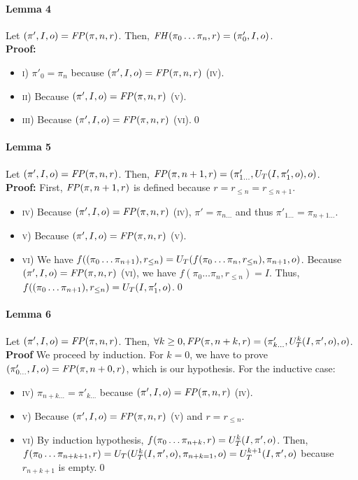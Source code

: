 \paragraph{Lemma 4}
Let $(\pi',I,o)=\mathit{FP}(\pi,n,r)$. Then, $\mathit{FH}(\pi_0\dots\pi_n,r)=(\pi'_0,I,o)$.\\
\textbf{Proof:} \begin{itemize}
\item\textsc{i)} $\pi'_0=\pi_n$ because $(\pi',I,o)=\mathit{FP}(\pi,n,r)$ (\textsc{iv}).
\item\textsc{ii)} Because $(\pi',I,o)=\mathit{FP}(\pi,n,r)$ (\textsc{v}).
\item\textsc{iii)} Because $(\pi',I,o)=\mathit{FP}(\pi,n,r)$ (\textsc{vi}).\qed
\end{itemize}

\paragraph{Lemma 5}
Let $(\pi',I,o)=\mathit{FP}(\pi,n,r)$. Then, $\mathit{FP}(\pi,n+1,r)=(\pi'_{1\dots},U_T(I,\pi'_1,o),o)$.\\
\textbf{Proof:}
First, $\mathit{FP}(\pi,n+1,r)$ is defined because $r=r_{\leq n}=r_{\leq n+1}$.
\begin{itemize}
\item\textsc{iv)} Because $(\pi',I,o)=\mathit{FP}(\pi,n,r)$ (\textsc{iv}), $\pi'=\pi_{n\dots}$ and thus $\pi'_{1\dots}=\pi_{n+1\dots}$.
\item\textsc{v)} Because $(\pi',I,o)=\mathit{FP}(\pi,n,r)$ (\textsc{v}).
\item\textsc{vi)} We have $f((\pi_0\dots\pi_{n+1}),r_{\leq n})=U_T(f(\pi_0\dots\pi_n,r_{\leq n}),\pi_{n+1},o)$. Because $(\pi',I,o)=\mathit{FP}(\pi,n,r)$ (\textsc{vi}), we have $f(\pi_0\dots\pi_n,r_{\leq n})=I$. Thus, $f((\pi_0\dots\pi_{n+1}),r_{\leq n})=U_T(I,\pi'_1,o)$.\qed
\end{itemize}

\paragraph{Lemma 6}
Let $(\pi',I,o)=\mathit{FP}(\pi,n,r)$. Then, $\forall k\geq 0, \mathit{FP}(\pi,n+k,r)=(\pi'_{k\dots},U_T^k(I,\pi',o),o)$.\\
\textbf{Proof} We proceed by induction.
For $k=0$, we have to prove $(\pi'_{0\dots},I,o)=\mathit{FP}(\pi,n+0,r)$, which is our hypothesis.
For the inductive case:
\begin{itemize}
\item\textsc{iv)} $\pi_{n+k\dots}=\pi'_{k\dots}$ because $(\pi',I,o)=\mathit{FP}(\pi,n,r)$ (\textsc{iv}).
\item\textsc{v)}  Because $(\pi',I,o)=\mathit{FP}(\pi,n,r)$ (\textsc{v}) and $r=r_{\leq n}$.
\item\textsc{vi)} By induction hypothesis, $f(\pi_0\dots\pi_{n+k},r)=U_T^k(I,\pi',o)$. Then, $f(\pi_0\dots\pi_{n+k+1},r)=U_T(U_T^k(I,\pi',o),\pi_{n+k=1},o)=U_T^{k+1}(I,\pi',o)$ because $r_{n+k+1}$ is empty.\qed
\end{itemize}

